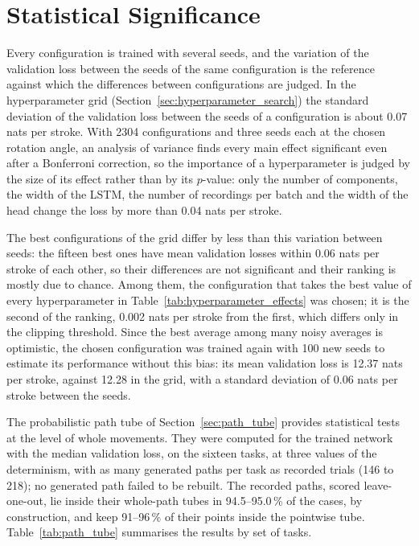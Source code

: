\documentclass[12pt]{report}
\begin{document}
\section{Statistical Significance}
\label{sec:statistical_significance}
Every configuration is trained with several seeds, and the variation of the validation loss between the seeds of the same configuration is the reference against which the differences between configurations are judged. In the hyperparameter grid (Section~\ref{sec:hyperparameter_search}) the standard deviation of the validation loss between the seeds of a configuration is about 0.07 nats per stroke. With 2304 configurations and three seeds each at the chosen rotation angle, an analysis of variance finds every main effect significant even after a Bonferroni correction, so the importance of a hyperparameter is judged by the size of its effect rather than by its $p$-value: only the number of components, the width of the LSTM, the number of recordings per batch and the width of the head change the loss by more than 0.04 nats per stroke.

The best configurations of the grid differ by less than this variation between seeds: the fifteen best ones have mean validation losses within 0.06 nats per stroke of each other, so their differences are not significant and their ranking is mostly due to chance. Among them, the configuration that takes the best value of every hyperparameter in Table~\ref{tab:hyperparameter_effects} was chosen; it is the second of the ranking, 0.002 nats per stroke from the first, which differs only in the clipping threshold. Since the best average among many noisy averages is optimistic, the chosen configuration was trained again with 100 new seeds to estimate its performance without this bias: its mean validation loss is 12.37 nats per stroke, against 12.28 in the grid, with a standard deviation of 0.06 nats per stroke between the seeds.

The probabilistic path tube of Section~\ref{sec:path_tube} provides statistical tests at the level of whole movements. They were computed for the trained network with the median validation loss, on the sixteen tasks, at three values of the determinism, with as many generated paths per task as recorded trials (146 to 218); no generated path failed to be rebuilt. The recorded paths, scored leave-one-out, lie inside their whole-path tubes in 94.5--95.0\,\% of the cases, by construction, and keep 91--96\,\% of their points inside the pointwise tube. Table~\ref{tab:path_tube} summarises the results by set of tasks.
\end{document}
